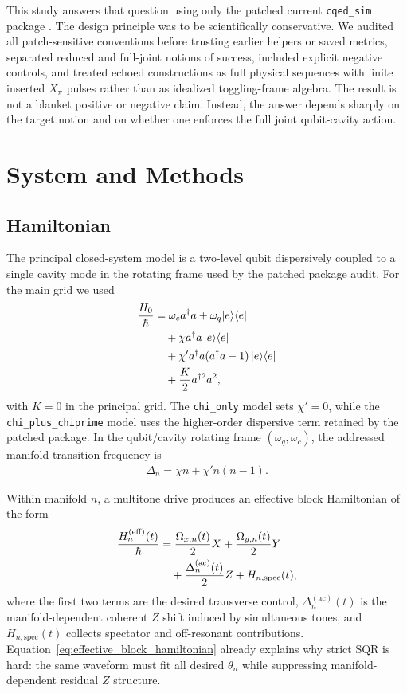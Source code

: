 \documentclass[aps,pra,twocolumn,reprint,floatfix,amsmath,amssymb]{revtex4-2}
\begin{document}
This study answers that question using only the patched current \texttt{cqed\_sim} package \cite{cqedsim2026}. The design principle was to be scientifically conservative. We audited all patch-sensitive conventions before trusting earlier helpers or saved metrics, separated reduced and full-joint notions of success, included explicit negative controls, and treated echoed constructions as full physical sequences with finite inserted $X_\pi$ pulses rather than as idealized toggling-frame algebra. The result is not a blanket positive or negative claim. Instead, the answer depends sharply on the target notion and on whether one enforces the full joint qubit-cavity action.

\section{System and Methods}

\subsection{Hamiltonian}
The principal closed-system model is a two-level qubit dispersively coupled to a single cavity mode in the rotating frame used by the patched package audit. For the main grid we used
\begin{align}
\frac{H_0}{\hbar}
&=
\omega_c a^\dagger a
+
\omega_q |e\rangle\langle e|
\notag\\
&\quad+
\chi a^\dagger a\, |e\rangle\langle e|
\notag\\
&\quad+
\chi' a^\dagger a (a^\dagger a - 1)\, |e\rangle\langle e|
\notag\\
&\quad+
\frac{K}{2} a^{\dagger 2} a^2,
\label{eq:static_hamiltonian}
\end{align}
with $K=0$ in the principal grid. The \texttt{chi\_only} model sets $\chi'=0$, while the \texttt{chi\_plus\_chiprime} model uses the higher-order dispersive term retained by the patched package. In the qubit/cavity rotating frame $(\omega_q,\omega_c)$, the addressed manifold transition frequency is
\begin{align}
\Delta_n = \chi n + \chi' n(n-1).
\label{eq:manifold_frequency}
\end{align}

Within manifold $n$, a multitone drive produces an effective block Hamiltonian of the form
\begin{align}
\frac{H_n^{(\mathrm{eff})}(t)}{\hbar}
&=
\frac{\Omega_{x,n}(t)}{2} X
+
\frac{\Omega_{y,n}(t)}{2} Y
\notag\\
&\quad+
\frac{\Delta_n^{(\mathrm{ac})}(t)}{2} Z
+
H_{n,\mathrm{spec}}(t),
\label{eq:effective_block_hamiltonian}
\end{align}
where the first two terms are the desired transverse control, $\Delta_n^{(\mathrm{ac})}(t)$ is the manifold-dependent coherent $Z$ shift induced by simultaneous tones, and $H_{n,\mathrm{spec}}(t)$ collects spectator and off-resonant contributions. Equation~\eqref{eq:effective_block_hamiltonian} already explains why strict SQR is hard: the same waveform must fit all desired $\theta_n$ while suppressing manifold-dependent residual $Z$ structure.
\end{document}
